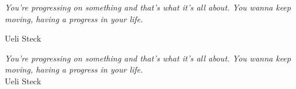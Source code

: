 \thispagestyle{empty}
\vspace*{\fill}
\emph{
    You're progressing on something and that's what it's all about. You wanna keep moving, having a progress in your life.
}
\vspace{2cm}
\begin{right}
  Ueli Steck
\end{right}

\vspace{4cm}

\emph{
    You're progressing on something and that's what it's all about. You wanna keep moving, having a progress in your life.\\
}
\hfill Ueli Steck
\vspace*{\fill}


